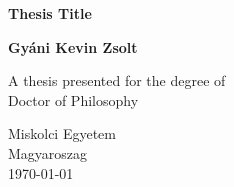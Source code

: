 \documentclass{book}
\begin{document}

\begin{titlepage}
   \begin{center}
       \vspace*{1cm}

       \textbf{Thesis Title}


       \vspace{1.5cm}

       \textbf{Gyáni Kevin Zsolt}

       \vfill
            
       A thesis presented for the degree of\\
       Doctor of Philosophy
            
       \vspace{0.8cm}
     
            
       
       Miskolci Egyetem\\
       Magyaroszag\\
       \today
            
   \end{center}
\end{titlepage}
\end{document}
